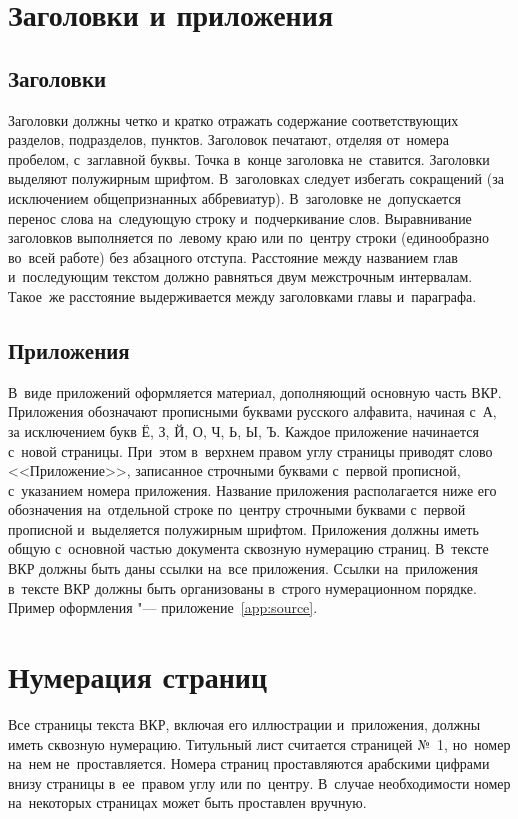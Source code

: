 \documentclass[a4paper,12pt]{diplom}
\begin{document}
\section{Заголовки и приложения}

\subsection{Заголовки}
Заголовки должны четко и кратко отражать содержание соответствующих разделов, подразделов, пунктов.
Заголовок печатают, отделяя от~номера пробелом, с~заглавной буквы. Точка в~конце заголовка не~ставится. 
Заголовки выделяют полужирным шрифтом.
В~заголовках следует избегать сокращений (за исключением общепризнанных аббревиатур). В~заголовке не~допускается перенос слова на~следующую строку и~подчеркивание слов.
Выравнивание заголовков выполняется по~левому краю или по~центру строки (единообразно во~всей работе) без абзацного отступа.
Расстояние между названием глав и~последующим текстом должно равняться двум межстрочным интервалам. Такое~же расстояние выдерживается между заголовками главы и~параграфа.

\subsection{Приложения}

В~виде приложений оформляется материал, дополняющий основную часть ВКР.  
Приложения обозначают прописными буквами русского алфавита, начиная с~А, за исключением букв Ё, З, Й, О, Ч, Ь, Ы, Ъ. 
Каждое приложение начинается с~новой страницы.  При~этом в~верхнем правом углу страницы приводят слово <<Приложение>>, записанное строчными буквами с~первой прописной, с~указанием номера приложения.  
Название приложения располагается ниже его обозначения на~отдельной строке по~центру  строчными буквами с~первой прописной и~выделяется полужирным шрифтом.
Приложения должны иметь общую с~основной частью документа сквозную нумерацию страниц.
В~тексте ВКР должны быть даны ссылки на~все приложения. 
Ссылки на~приложения в~тексте ВКР должны быть организованы в~строго нумерационном порядке.
Пример оформления "--- приложение~\ref{app:source}.

\section{Нумерация страниц}

Все страницы текста ВКР, включая его иллюстрации и~приложения, должны иметь сквозную нумерацию. 
Титульный лист считается страницей №~1, но~номер на~нем не~проставляется. 
Номера страниц проставляются арабскими цифрами внизу страницы в~ее~правом углу или по~центру. В~случае необходимости номер на~некоторых страницах может быть проставлен вручную.
\end{document}
